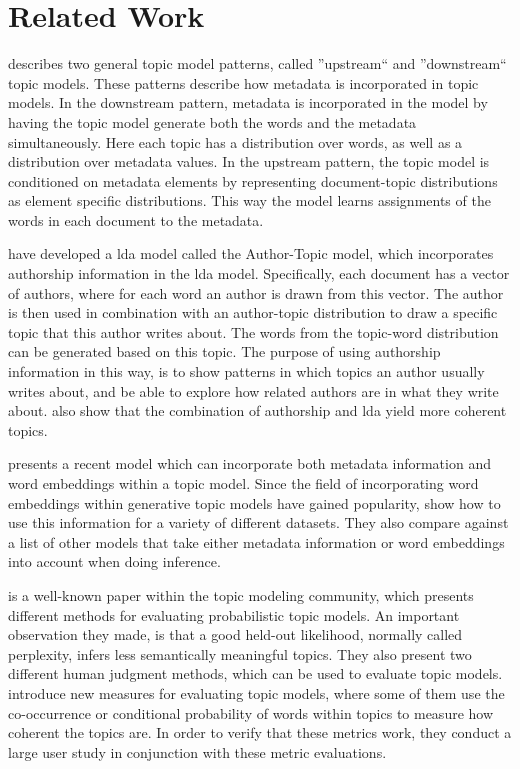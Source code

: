 \section{Related Work}\label{sec:related_work}

\citet{mimno2008topic} describes two general topic model patterns, called ''upstream`` and ''downstream`` topic models.
These patterns describe how metadata is incorporated in topic models.
In the downstream pattern, metadata is incorporated in the model by having the topic model generate both the words and the metadata simultaneously.
Here each topic has a distribution over words, as well as a distribution over metadata values.
In the upstream pattern, the topic model is conditioned on metadata elements by representing document-topic distributions as element specific distributions.
This way the model learns assignments of the words in each document to the metadata.

\citet{author_topic_2012} have developed a \gls{lda} model called the Author-Topic model, which incorporates authorship information in the \gls{lda} model.
Specifically, each document has a vector of authors, where for each word an author is drawn from this vector.
The author is then used in combination with an author-topic distribution to draw a specific topic that this author writes about.
The words from the topic-word distribution can be generated based on this topic.
The purpose of using authorship information in this way, is to show patterns in which topics an author usually writes about, and be able to explore how related authors are in what they write about.
\citeauthor{author_topic_2012} also show that the combination of authorship and \gls{lda} yield more coherent topics.


\citet{MetaLDA2017} presents a recent model which can incorporate both metadata information and word embeddings within a topic model.
Since the field of incorporating word embeddings within generative topic models have gained popularity\cite{dieng2020topic}, \citet{MetaLDA2017} show how to use this information for a variety of different datasets.
They also compare against a list of other models that take either metadata information or word embeddings into account when doing inference.


\citet{tea_leaves} is a well-known paper within the topic modeling community, which presents different methods for evaluating probabilistic topic models. 
An important observation they made, is that a good held-out likelihood, normally called perplexity, infers less semantically meaningful topics.
They also present two different human judgment methods, which can be used to evaluate topic models.
\citet{topic_coherence_2015} introduce new measures for evaluating topic models, where some of them use the co-occurrence or conditional probability of words within topics to measure how coherent the topics are. 
In order to verify that these metrics work, they conduct a large user study in conjunction with these metric evaluations.


